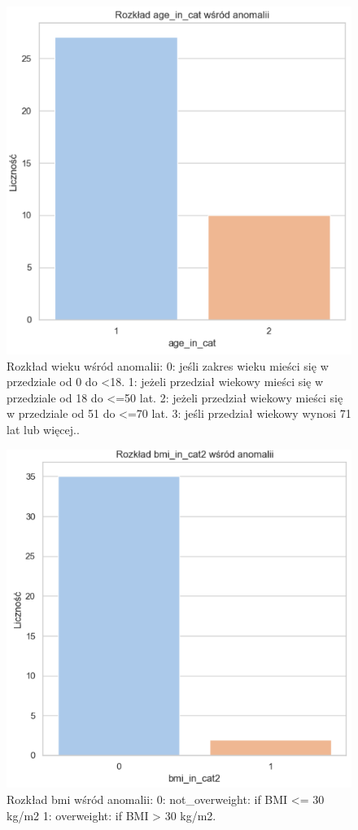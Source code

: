 \documentclass[a4paper,fleqn]{cas-dc}
\begin{document}
\begin{figure}[h]
	\includegraphics[scale=.73]{wykresy/wykres6.png}
	\caption{Rozkład wieku wśród anomalii: 0: jeśli zakres wieku mieści się w przedziale od 0 do <18. 
1: jeżeli przedział wiekowy mieści się w przedziale od 18 do <=50 lat.
2: jeżeli przedział wiekowy mieści się w przedziale od 51 do <=70 lat.
3: jeśli przedział wiekowy wynosi 71 lat lub więcej..}
	\label{FIG:1}
\end{figure}

\begin{figure}[h]
	\includegraphics[scale=.73]{wykresy/wykres7.png}
	\caption{Rozkład bmi wśród anomalii: 0: not\_overweight: if BMI <= 30 kg/m2 
1: overweight: if BMI > 30 kg/m2.}
	\label{FIG:1}
\end{figure}
\end{document}
